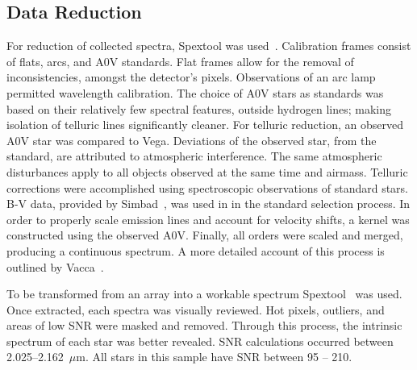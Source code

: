 \subsection{Data Reduction}

For reduction of collected spectra, Spextool was used~\cite{Cushing_2004}. 
Calibration frames consist of flats, arcs, and A0V standards.  Flat frames allow for the removal of inconsistencies, amongst the detector's pixels.  Observations of an arc lamp permitted wavelength calibration.  The choice of A0V stars as standards was based on their relatively few spectral features, outside hydrogen lines; making isolation of telluric lines significantly cleaner.  
For telluric reduction, an observed A0V star was compared to Vega.  Deviations of the observed star, from the standard, are attributed to atmospheric interference.  The same atmospheric disturbances apply to all objects observed at the same time and airmass.  Telluric corrections were accomplished using spectroscopic observations of standard stars. B-V data, provided by Simbad~\cite{simbad}, was used in in the standard selection process.
In order to properly scale emission lines and account for velocity shifts, a kernel was constructed using the observed A0V.  Finally, all orders were scaled and merged, producing a continuous spectrum.
A more detailed account of this process is outlined by Vacca~\cite{Vacca_2003}.  



To be transformed from an array into a workable spectrum Spextool~\cite{Cushing_2004} was used.  Once extracted, each spectra was visually reviewed.  Hot pixels, outliers, and areas of low SNR were masked and removed.  Through this process, the intrinsic spectrum of each star was better revealed.  SNR calculations occurred between 2.025--2.162~$\mu$m.  All stars in this sample have SNR between 95 -- 210.